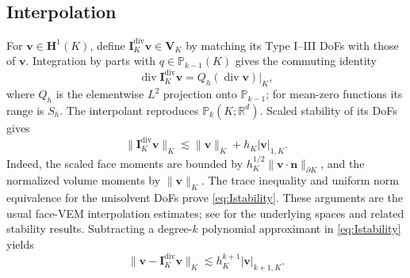 \documentclass[review,hidelinks,onefignum,onetabnum]{siamart251216}
\begin{document}
\subsection{Interpolation}
For $\boldsymbol v\in\boldsymbol H^1(K)$, define
$\boldsymbol I_K^{\operatorname{div}}\boldsymbol v\in\boldsymbol V_K$
by matching its Type I--III DoFs with those of $\boldsymbol v$.
Integration by parts with $q\in\mathbb P_{k-1}(K)$ gives the commuting identity
\begin{equation}\label{eq:commuting}
\operatorname{div}\boldsymbol I_K^{\operatorname{div}}\boldsymbol v
=Q_h(\operatorname{div}\boldsymbol v)|_K,
\end{equation}
where $Q_h$ is the elementwise $L^2$ projection onto $\mathbb P_{k-1}$;
for mean-zero functions its range is $S_h$.
The interpolant reproduces $\mathbb P_k(K;\mathbb R^d)$.
Scaled stability of its DoFs gives
\begin{equation}\label{eq:Istability}
\|\boldsymbol I_K^{\operatorname{div}}\boldsymbol v\|_K
\lesssim\|\boldsymbol v\|_K+h_K|\boldsymbol v|_{1,K}.
\end{equation}
Indeed, the scaled face moments are bounded by
$h_K^{1/2}\|\boldsymbol v\cdot\boldsymbol n\|_{\partial K}$,
and the normalized volume moments by $\|\boldsymbol v\|_K$.
The trace inequality and uniform norm equivalence for the unisolvent DoFs
prove \eqref{eq:Istability}. These arguments are the usual face-VEM
interpolation estimates; see \cite{BBMR2016,BMM2022} for the underlying
spaces and related stability results. Subtracting a degree-$k$ polynomial
approximant in \eqref{eq:Istability} yields
\begin{equation}\label{eq:Iapprox}
\|\boldsymbol v-\boldsymbol I_K^{\operatorname{div}}\boldsymbol v\|_K
\lesssim h_K^{k+1}|\boldsymbol v|_{k+1,K}.
\end{equation}
\end{document}
